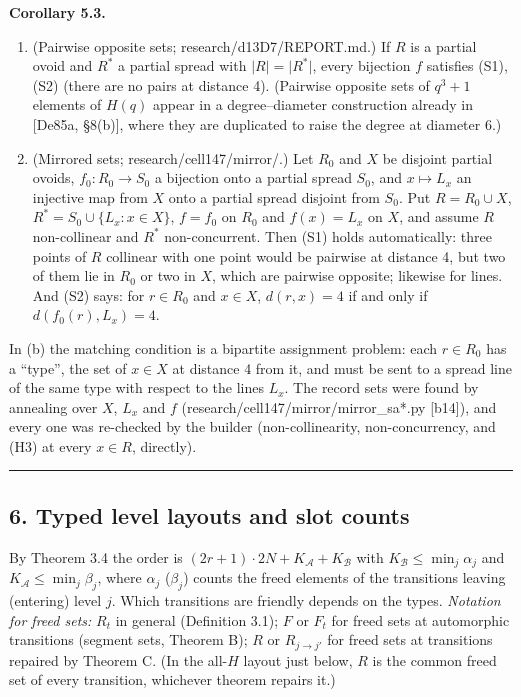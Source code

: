 \documentclass[
  11pt,
]{article}
\providecommand{\tightlist}{%
  \setlength{\itemsep}{0pt}\setlength{\parskip}{0pt}}
\begin{document}
\textbf{Corollary 5.3.}

\begin{enumerate}
\def\labelenumi{(\alph{enumi})}
\tightlist
\item
  (Pairwise opposite sets; research/d13D7/REPORT.md.) If \(R\) is a partial ovoid and \(R^*\) a partial spread with
  \(\lvert R\rvert = \lvert R^*\rvert\), every bijection \(f\) satisfies (S1), (S2) (there are no pairs at distance 4).
  (Pairwise opposite sets of \(q^3+1\) elements of \(H(q)\) appear in a degree--diameter construction already in
  {[}De85a, §8(b){]}, where they are duplicated to raise the degree at diameter 6.)
\item
  (Mirrored sets; research/cell147/mirror/.) Let \(R_0\) and \(X\) be disjoint partial ovoids, \(f_0: R_0\to S_0\) a
  bijection onto a partial spread \(S_0\), and \(x\mapsto L_x\) an injective map from \(X\) onto a partial spread
  disjoint from \(S_0\). Put \(R = R_0\cup X\), \(R^* = S_0\cup\{L_x : x\in X\}\), \(f = f_0\) on \(R_0\) and
  \(f(x) = L_x\) on \(X\), and assume \(R\) non-collinear and \(R^*\) non-concurrent. Then (S1) holds automatically:
  three points of \(R\) collinear with one point would be pairwise at distance 4, but two of them lie in \(R_0\) or two
  in \(X\), which are pairwise opposite; likewise for lines. And (S2) says: for \(r\in R_0\) and \(x\in X\),
  \(d(r,x) = 4\) if and only if \(d(f_0(r), L_x) = 4\).
\end{enumerate}

In (b) the matching condition is a bipartite assignment problem: each \(r\in R_0\) has a ``type'', the set of \(x\in X\)
at distance 4 from it, and must be sent to a spread line of the same type with respect to the lines \(L_x\). The record
sets were found by annealing over \(X\), \(L_x\) and \(f\) (research/cell147/mirror/mirror\_sa*.py {[}b14{]}), and every
one was re-checked by the builder (non-collinearity, non-concurrency, and (H3) at every \(x\in R\), directly).

\begin{center}\rule{0.5\linewidth}{0.5pt}\end{center}

\hypertarget{typed-level-layouts-and-slot-counts}{%
\subsection{6. Typed level layouts and slot counts}\label{typed-level-layouts-and-slot-counts}}

By Theorem 3.4 the order is \((2r+1)\cdot 2N + K_{\mathcal A} + K_{\mathcal B}\) with
\(K_{\mathcal B}\le\min_j\alpha_j\) and \(K_{\mathcal A}\le\min_j\beta_j\), where \(\alpha_j\) (\(\beta_j\)) counts the
freed elements of the transitions leaving (entering) level \(j\). Which transitions are friendly depends on the types.
\emph{Notation for freed sets:} \(R_t\) in general (Definition 3.1); \(F\) or \(F_t\) for freed sets at automorphic
transitions (segment sets, Theorem B); \(R\) or \(R_{j\to j'}\) for freed sets at transitions repaired by Theorem C. (In
the all-\(H\) layout just below, \(R\) is the common freed set of every transition, whichever theorem repairs it.)
\end{document}
